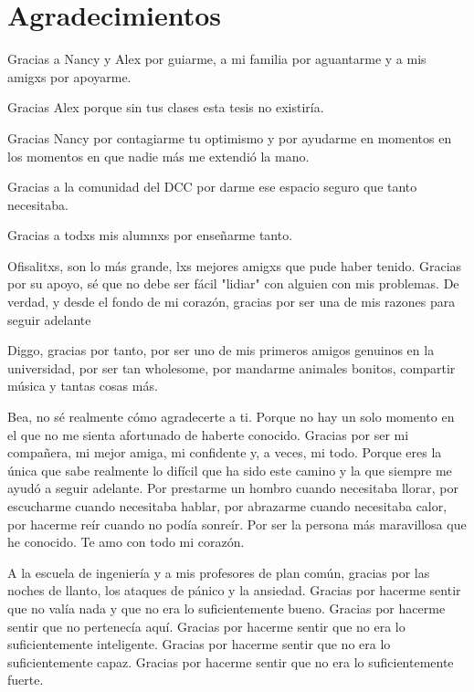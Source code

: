 \section*{Agradecimientos}
  Gracias a Nancy y Alex por guiarme, a mi familia por aguantarme y a mis amigxs por apoyarme.

  Gracias Alex porque sin tus clases esta tesis no existiría.

  Gracias Nancy por contagiarme tu optimismo y por ayudarme en momentos en los
  momentos en que nadie más me extendió la mano.

  Gracias a la comunidad del DCC por darme ese espacio seguro que tanto necesitaba.

  Gracias a todxs mis alumnxs por enseñarme tanto.


  Ofisalitxs, son lo más grande, lxs mejores amigxs que pude haber tenido.
  Gracias por su apoyo, sé que no debe ser fácil "lidiar" con alguien con mis 
  problemas. De verdad, y desde el fondo de mi corazón, gracias por ser una de mis razones para seguir adelante
  
  Diggo, gracias por tanto, por ser uno de mis primeros amigos genuinos en la universidad, por
  ser tan wholesome, por mandarme animales bonitos, compartir música y tantas cosas más.
  

  Bea, no sé realmente cómo agradecerte a ti.
  Porque no hay un solo momento en el que no me sienta afortunado de haberte conocido.
  Gracias por ser mi compañera, mi mejor amiga, mi confidente y, a veces, mi todo.
  Porque eres la única que sabe realmente lo difícil que ha sido este camino y la que siempre me
  ayudó a seguir adelante.
  Por prestarme un hombro cuando necesitaba llorar, por escucharme cuando necesitaba hablar, por
  abrazarme cuando necesitaba calor, por hacerme reír cuando no podía sonreír.
  Por ser la persona más maravillosa que he conocido.
  Te amo con todo mi corazón.

  A la escuela de ingeniería y a mis profesores de plan común, gracias por
  las noches de llanto, los ataques de pánico y la ansiedad.
  Gracias por hacerme sentir que no valía nada y que no era lo suficientemente
  bueno.
  Gracias por hacerme sentir que no pertenecía aquí.
  Gracias por hacerme sentir que no era lo suficientemente inteligente.
  Gracias por hacerme sentir que no era lo suficientemente capaz.
  Gracias por hacerme sentir que no era lo suficientemente fuerte.
  